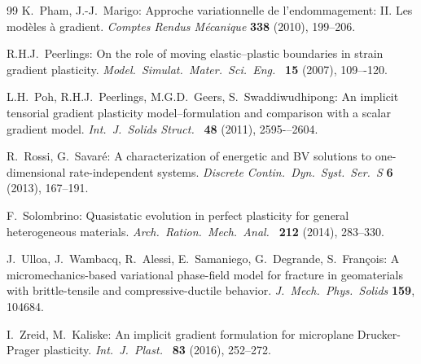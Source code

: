 \documentclass[reqno]{amsart}
\theoremstyle{definition}
\numberwithin{equation}{section}
\begin{document}
\begin{thebibliography}{99}
{\sc K.~Pham, J.-J.~Marigo}: 
Approche variationnelle de l'endommagement: II. Les modèles à gradient.
{\it Comptes Rendus Mécanique} {\bf 338} (2010), 199--206.
  
{\sc  R.H.J.~Peerlings}:
On the role of moving elastic–plastic boundaries in strain gradient plasticity.
{\it Model.\ Simulat.\ Mater.\ Sci.\ Eng.\ } {\bf 15} (2007),  109–-120.

{\sc L.H.~Poh, R.H.J.~Peerlings, M.G.D.~Geers, S.~Swaddiwudhipong}: 
An implicit tensorial gradient plasticity model–formulation and comparison with a scalar gradient model.
{\it Int.\ J.\ Solids Struct.\ } {\bf 48} (2011), 2595-–2604.

{\sc R.~Rossi, G.~Savaré}:
A characterization of energetic and BV solutions to one-dimensional rate-independent systems.
{\it Discrete Contin.\ Dyn.\ Syst.\ Ser.\ S} {\bf 6} (2013), 167--191.

{\sc F.~Solombrino}:
Quasistatic evolution in perfect plasticity for general heterogeneous materials.
{\it Arch.\ Ration.\ Mech.\ Anal.\ } {\bf 212} (2014), 283--330.

{\sc J.~Ulloa, J.~Wambacq, R.~Alessi, E.~Samaniego, G.~Degrande, S.~François}: 
A micromechanics-based variational phase-field model for fracture in geomaterials with brittle-tensile and compressive-ductile behavior.
{\it J.\ Mech.\ Phys.\ Solids} {\bf 159}, 104684.

{\sc I.~Zreid, M.~Kaliske}: 
An implicit gradient formulation for microplane Drucker-Prager plasticity.
{\it Int.\ J.\ Plast.\ } {\bf 83} (2016), 252--272.

\end{thebibliography}
\end{document}
